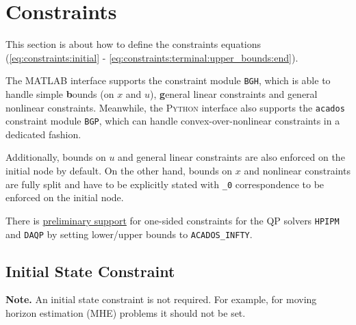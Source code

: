\documentclass[english]{article}
\newcommand{\code}[1]{\texttt{#1}}
\newcommand{\str}[1]{\texttt{'#1'}}
\newcommand{\acados}{\texttt{acados}}
\newcommand{\matlab}{\textsc{MATLAB}}
\newcommand{\python}{\textsc{Python}}
\begin{document}
\section{Constraints}\label{sec:constraints}
%
This section is about how to define the constraints equations (\ref{eq:constraints:initial} - \ref{eq:constraints:terminal:upper_bounds:end}).

The \matlab{} interface supports the constraint module \code{BGH}, which is able to handle simple \textbf{b}ounds (on $ x $ and $ u $), \textbf{g}eneral linear constraints and general nonlinear constraints.
Meanwhile, the \python{} interface also supports the \acados{} constraint module \code{BGP}, which can handle convex-over-nonlinear constraints in a dedicated fashion.

Additionally, bounds on $u$ and general linear constraints are also enforced on the initial node by default.
On the other hand, bounds on $x$ and nonlinear constraints are fully split and have to be explicitly stated with \code{\_0} correspondence to be enforced on the initial node.

There is \href{https://github.com/acados/acados/issues/650}{preliminary support} for one-sided constraints for the QP solvers \code{HPIPM} and \code{DAQP} by setting lower/upper bounds to \code{ACADOS\_INFTY}.


%
\subsection{Initial State Constraint}\label{sec:constraints:initial}
%
\textbf{Note.} An initial state constraint is not required.
For example, for moving horizon estimation (MHE) problems it should not be set.
\end{document}
